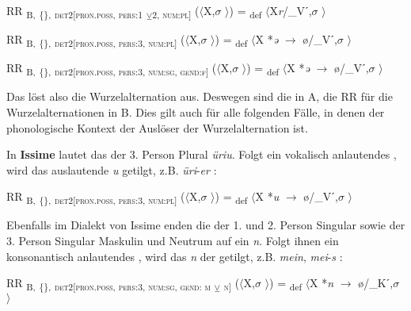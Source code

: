 \ea%
\label{ex:key:155}
 RR \textsubscript{B,} \textsubscript{\{\}}\textsubscript{,} \textsubscript{\textsc{det2[pron.poss}, \textsc{pers:1}} \textsubscript{\tiny $\veebar$}\textsubscript{\textsc{2}}\textsubscript{, \textsc{num:pl}]} ($\langle$X,$\sigma$ $\rangle$) = \textsubscript{def} $\langle$X\textit{r}/\_Vˊ,$\sigma$ $\rangle$
\z

\ea%
\label{ex:key:156}
 RR \textsubscript{B,} \textsubscript{\{\}}\textsubscript, \textsubscript{\textsc{det2[pron.poss}, \textsc{pers:3}, \textsc{num:pl}]} ($\langle$X,$\sigma$ $\rangle$) = \textsubscript{def} $\langle$X *\textit{ə} $\rightarrow$ ø/\_Vˊ,$\sigma$ $\rangle$
\z

\ea%
\label{ex:key:157}
 RR \textsubscript{B,} \textsubscript{\{\}}\textsubscript, \textsubscript{\textsc{det2[pron.poss}, \textsc{pers:3}, \textsc{num:sg}, \textsc{gend:f}]} ($\langle$X,$\sigma$ $\rangle$) = \textsubscript{def} $\langle$X *\textit{ə} $\rightarrow$ ø/\_Vˊ,$\sigma$ $\rangle$
\z

Das  löst also die Wurzelalternation aus. Deswegen sind die  in  A, die RR für die Wurzelalternationen in  B. Dies gilt auch für alle folgenden Fälle, in denen der phonologische Kontext der Auslöser der Wurzelalternation ist.

In \textbf{Issime} lautet das  der 3. Person Plural \textit{üriu}. Folgt ein vokalisch anlautendes , wird das auslautende \textit{u} getilgt, z.B. \textit{üri}-\textit{er} \citep[84]{Perinetto1981}:

\ea%
\label{ex:key:158}
 RR \textsubscript{B,} \textsubscript{\{\}}\textsubscript{,} \textsubscript{\textsc{det2[pron.poss}, \textsc{pers:3}, \textsc{num:pl}]} ($\langle$X,$\sigma$ $\rangle$) = \textsubscript{def} $\langle$X *\textit{u} $\rightarrow$ ø/\_Vˊ,$\sigma$ $\rangle$ \\
\z

Ebenfalls im Dialekt von Issime enden die  der 1. und 2. Person Singular sowie der 3. Person Singular Maskulin und Neutrum auf ein \textit{n}. Folgt ihnen ein konsonantisch anlautendes , wird das \textit{n} der  getilgt, z.B. \textit{mein}, \textit{mei}-\textit{s} \citep[83]{Perinetto1981}:

\ea%
\label{ex:key:159}
 RR \textsubscript{B,} \textsubscript{\{\}}\textsubscript{,} \textsubscript{\textsc{det2[pron.poss}, \textsc{pers:3}, \textsc{num:sg}, \textsc{gend: m}} \textsubscript{\tiny $\veebar$}\textsubscript{ \textsc{n}}\textsubscript{]} ($\langle$X,$\sigma$ $\rangle$) = \textsubscript{def} $\langle$X *\textit{n} $\rightarrow$ ø/\_Kˊ,\mbox{$\sigma$ $\rangle$}
\z

